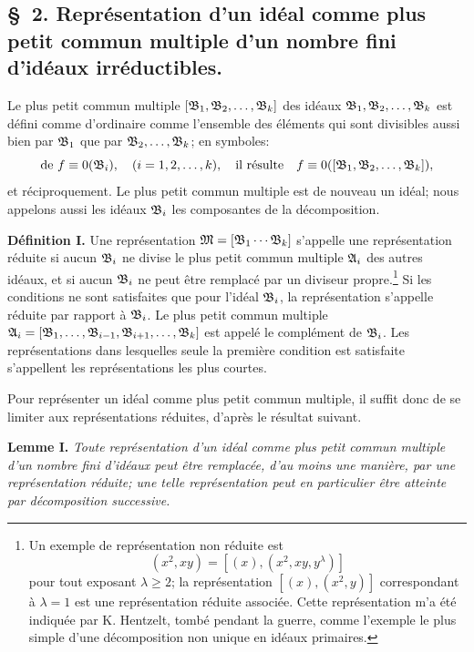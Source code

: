 \subsection*{\S~2. Représentation d'un idéal comme plus petit commun multiple d'un nombre fini d'idéaux irréductibles.}

Le plus petit commun multiple $[\mathfrak{B}_1,\mathfrak{B}_2,\ldots,\mathfrak{B}_k]$ des idéaux $\mathfrak{B}_1,\mathfrak{B}_2,\ldots,\mathfrak{B}_k$ est défini comme d'ordinaire comme l'ensemble des éléments qui sont divisibles aussi bien par $\mathfrak{B}_1$ que par $\mathfrak{B}_2,\ldots,\mathfrak{B}_k$; en symboles:
\[
 \text{de } f\equiv0(\mathfrak{B}_i),\quad (i=1,2,\ldots,k),
 \quad\text{il résulte}\quad
 f\equiv0([\mathfrak{B}_1,\mathfrak{B}_2,\ldots,\mathfrak{B}_k]),
\]
et réciproquement. Le plus petit commun multiple est de nouveau un idéal; nous appelons aussi les idéaux $\mathfrak{B}_i$ les composantes de la décomposition.

\textbf{Définition I.} Une représentation $\mathfrak{M}=[\mathfrak{B}_1\cdots\mathfrak{B}_k]$ s'appelle une représentation réduite si aucun $\mathfrak{B}_i$ ne divise le plus petit commun multiple $\mathfrak{A}_i$ des autres idéaux, et si aucun $\mathfrak{B}_i$ ne peut être remplacé par un diviseur propre.\footnote{Un exemple de représentation non réduite est
\[
 (x^2,xy)=[(x),(x^2,xy,y^\lambda)]
\]
pour tout exposant $\lambda\ge2$; la représentation $[(x),(x^2,y)]$ correspondant à $\lambda=1$ est une représentation réduite associée. Cette représentation m'a été indiquée par K. Hentzelt, tombé pendant la guerre, comme l'exemple le plus simple d'une décomposition non unique en idéaux primaires.} Si les conditions ne sont satisfaites que pour l'idéal $\mathfrak{B}_i$, la représentation s'appelle réduite par rapport à $\mathfrak{B}_i$. Le plus petit commun multiple $\mathfrak{A}_i=[\mathfrak{B}_1,\ldots,\mathfrak{B}_{i-1},\mathfrak{B}_{i+1},\ldots,\mathfrak{B}_k]$ est appelé le complément de $\mathfrak{B}_i$. Les représentations dans lesquelles seule la première condition est satisfaite s'appellent les représentations les plus courtes.

Pour représenter un idéal comme plus petit commun multiple, il suffit donc de se limiter aux représentations réduites, d'après le résultat suivant.

\textbf{Lemme I.} \emph{Toute représentation d'un idéal comme plus petit commun multiple d'un nombre fini d'idéaux peut être remplacée, d'au moins une manière, par une représentation réduite; une telle représentation peut en particulier être atteinte par décomposition successive.}

